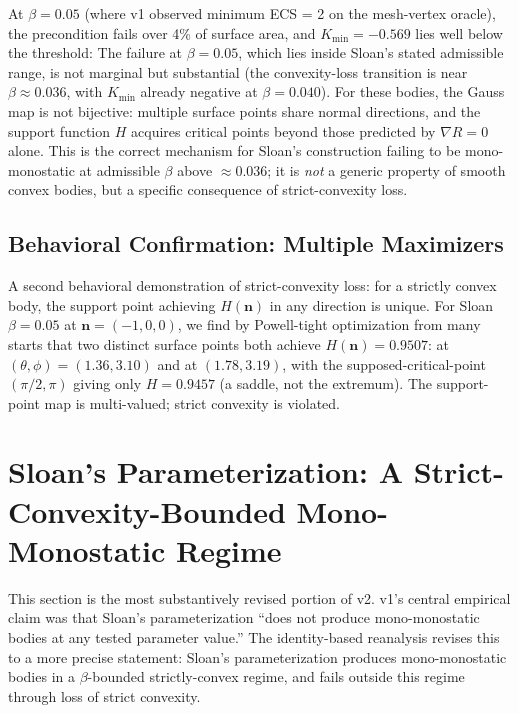 \documentclass[11pt,a4paper]{article}
\begin{document}
At $\beta = 0.05$ (where v1 observed minimum ECS = 2 on the
mesh-vertex oracle), the precondition fails over 4\% of surface
area, and $K_{\min} = -0.569$ lies well below the threshold:
The failure at $\beta = 0.05$, which lies inside Sloan's stated
admissible range, is not marginal but substantial (the convexity-loss transition is
near $\beta \approx 0.036$, with $K_{\min}$ already negative at
$\beta = 0.040$). For these bodies, the
Gauss map is not bijective: multiple surface points share normal
directions, and the support function $H$ acquires critical points
beyond those predicted by $\nabla R = 0$ alone. This is the correct
mechanism for Sloan's construction failing to be mono-monostatic at
admissible $\beta$ above $\approx 0.036$; it is \emph{not} a generic property of smooth
convex bodies, but a specific consequence of strict-convexity loss.

\subsection{Behavioral Confirmation: Multiple Maximizers}

A second behavioral demonstration of strict-convexity loss: for a
strictly convex body, the support point achieving $H(\mathbf{n})$ in
any direction is unique. For Sloan $\beta = 0.05$ at
$\mathbf{n} = (-1, 0, 0)$, we find by Powell-tight optimization
from many starts that two distinct surface points both achieve
$H(\mathbf{n}) = 0.9507$: at $(\theta,\phi) = (1.36, 3.10)$ and at
$(1.78, 3.19)$, with the supposed-critical-point $(\pi/2, \pi)$
giving only $H = 0.9457$ (a saddle, not the extremum). The
support-point map is multi-valued; strict convexity is violated.

\section{Sloan's Parameterization: A Strict-Convexity-Bounded
Mono-Monostatic Regime}
\label{sec:sloan_regime}

This section is the most substantively revised portion of v2.
v1's central empirical claim was that Sloan's parameterization
``does not produce mono-monostatic bodies at any tested parameter
value.'' The identity-based reanalysis revises this to a more
precise statement: Sloan's parameterization produces mono-monostatic
bodies in a $\beta$-bounded strictly-convex regime, and fails outside
this regime through loss of strict convexity.
\end{document}
